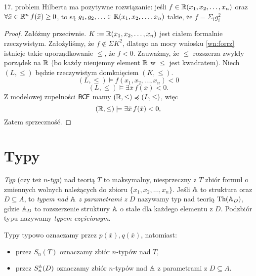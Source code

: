 \documentclass{article}
\begin{document}
\begin{tw}
	 17. problem Hilberta ma pozytywne rozwiązanie:
	 jeśli $f \in \mathbb{R}(x_1, x_2, \ldots, x_n)$ oraz $\forall \bar{x} \in \mathbb{R}^n \, f(\bar{x}) \geq 0$,
	 to są $g_1, g_2, \ldots \in \mathbb{R}(x_1, x_2, \ldots, x_n)$ takie, że $f = \Sigma_i g_i^2$
\end{tw}
\begin{proof}
	 Załóżmy przeciwnie.
	 $K := \mathbb{R}(x_1, x_2, \ldots, x_n) $ jest ciałem formalnie rzeczywistym.
	 Założyliśmy, że $f \not \in \Sigma K^2$, dlatego na mocy wniosku \ref{wn:forrz} istnieje takie uporządkowanie $\leq$,
	 że $f < 0$.
	 Zauważmy, że $\leq$ rozszerza zwykły porządek na $\mathbb{R}$ (bo każdy nieujemny element $\mathbb{R}$ w $\leq$ jest kwadratem).
	 Niech $(L, \leq)$ będzie rzeczywistym domknięciem $(K, \leq)$.
	 \[
	 	 (L, \leq) \models f(x_1, x_2, \ldots, x_n ) < 0
	 \]
	 \[
	 	 (L, \leq) \models \exists \bar{x}  \, f(\bar{x}) < 0.
	 \]
	 Z modelowej zupełności $\mathsf{R \mkern-1.7mu C \mkern-1.4mu F}$ mamy $(\mathbb{R}, \leq) \preccurlyeq (L, \leq)$, więc
	 \[
	 	 (\mathbb{R}, \leq) \models  \exists \bar{x}  \, f(\bar{x}) < 0,
	 \]
Zatem sprzeczność.
\end{proof}


\section{Typy}

\begin{df}
	\textit{Typ} (czy też $n$-\textit{typ}) nad teorią $T$ to maksymalny, niesprzeczny z $T$ zbiór formuł o zmiennych wolnych należących do zbioru $\{x_1, x_2, \ldots, x_n\}$.
		Jeśli $\mathbb{A}$ to struktura oraz $D \subseteq A$, to \textit{typem nad $\mathbb{A}$ z parametrami z $D$} nazywamy typ nad teorią $\text{Th}(\mathbb{A}_D)$, gdzie $\mathbb{A}_D$ to rozszerzenie struktury $\mathbb{A}$ o stałe dla każdego elementu z $D$.
		Podzbiór typu nazywamy \textit{typem częściowym}.
\end{df}

\begin{ozn}
	Typy typowo oznaczamy przez $p(\bar{x}), q(\bar{x})$, natomiast:
	 ~\begin{itemize}
		 \item przez $S_n(T)$ oznaczamy zbiór $n$-typów nad $T$,
		 \item przez $S_n^{\mathbb{A}}(D)$ oznaczamy zbiór $n$-typów nad $\mathbb{A}$ z parametrami z $D \subseteq A$.
	 \end{itemize}
\end{ozn}
\end{document}

